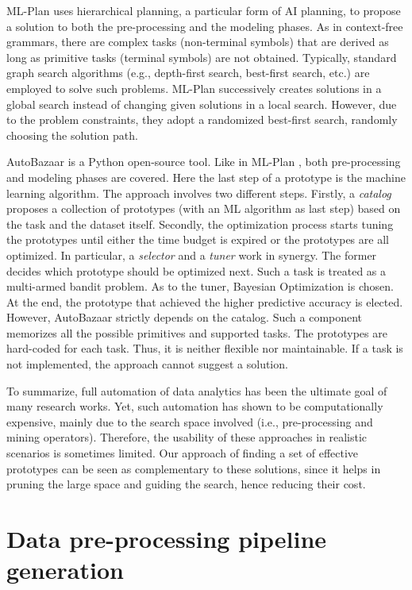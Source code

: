 ML-Plan \cite{mohr2018ml} uses hierarchical planning, a particular form of AI planning, to propose a solution to both the pre-processing and the modeling phases.
As in context-free grammars, there are complex tasks (non-terminal symbols) that are derived as long as primitive tasks (terminal symbols) are not obtained.
Typically, standard graph search algorithms (e.g., depth-first search, best-first search, etc.) are employed to solve such problems.
ML-Plan successively creates solutions in a global search instead of changing given solutions in a local search. However, due to the problem constraints, they adopt a randomized best-first search, randomly choosing the solution path.

AutoBazaar \cite{AutoBazaar} is a Python open-source tool.
Like in ML-Plan \cite{mohr2018ml}, both pre-processing and modeling phases are covered.
Here the last step of a prototype is the machine learning algorithm.
The approach involves two different steps.
Firstly, a \textit{catalog} proposes a collection of prototypes (with an ML algorithm as last step) based on the task and the dataset itself.
Secondly, the optimization process starts tuning the prototypes until either the time budget is expired or the prototypes are all optimized.
In particular, a \textit{selector} and a \textit{tuner} work in synergy.
The former decides which prototype should be optimized next.
Such a task is treated as a multi-armed bandit problem.
As to the tuner, Bayesian Optimization is chosen.
At the end, the prototype that achieved the higher predictive accuracy is elected.
However, AutoBazaar strictly depends on the catalog.
Such a component memorizes all the possible primitives and supported tasks.
The prototypes are hard-coded for each task.
Thus, it is neither flexible nor maintainable.
If a task is not implemented, the approach cannot suggest a solution.

To summarize, full automation of data analytics has been the ultimate goal of many research works.
Yet, such automation has shown to be computationally expensive, mainly due to the search space involved (i.e., pre-processing and mining operators).
Therefore, the usability of these approaches in realistic scenarios is sometimes limited.
Our approach of finding a set of effective prototypes can be seen as complementary to these solutions, since it helps in pruning the large space and guiding the search, hence reducing their cost.

\section{Data pre-processing pipeline generation}
\label{sec:methodology}


